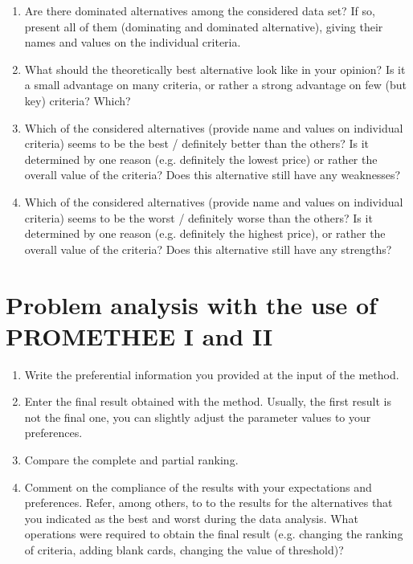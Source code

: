 \documentclass{article}
\begin{document}
\begin{enumerate}
    \item Are there dominated alternatives among the considered data set? If so, present all of them (dominating
    and dominated alternative), giving their names and values on the individual criteria.

    \item What should the theoretically best alternative look like in your opinion? Is it a small advantage on
    many criteria, or rather a strong advantage on few (but key) criteria? Which?

    \item Which of the considered alternatives (provide name and values on individual criteria) seems to be the
    best / definitely better than the others? Is it determined by one reason (e.g. definitely the lowest
    price) or rather the overall value of the criteria? Does this alternative still have any weaknesses?

    \item Which of the considered alternatives (provide name and values on individual criteria) seems to be the
    worst / definitely worse than the others? Is it determined by one reason (e.g. definitely the highest
    price), or rather the overall value of the criteria? Does this alternative still have any strengths?

\end{enumerate}


\section{Problem analysis with the use of PROMETHEE I and II}

\begin{enumerate}

    \item Write the preferential information you provided at the input of the method.

    \item Enter the final result obtained with the method. Usually, the first result is not the final one, you can
    slightly adjust the parameter values to your preferences.

    \item Compare the complete and partial ranking.

    \item Comment on the compliance of the results with your expectations and preferences. Refer, among
    others, to to the results for the alternatives that you indicated as the best and worst during the data
    analysis. What operations were required to obtain the final result (e.g. changing the ranking of criteria,
    adding blank cards, changing the value of threshold)?

\end{enumerate}
\end{document}
